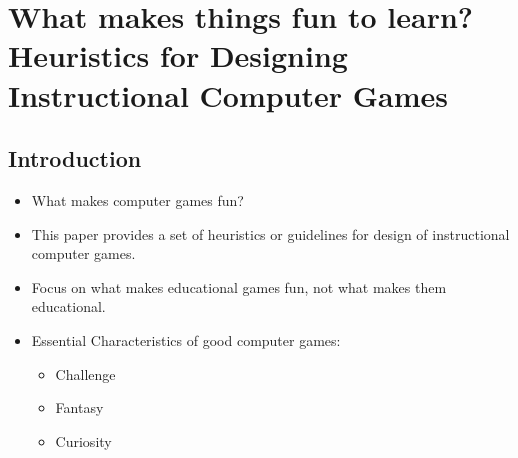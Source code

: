 \chapter*{What makes things fun to learn? Heuristics for Designing Instructional Computer Games}

  \section*{Introduction}
  \begin{itemize}
    \item What makes computer games fun?
    \item This paper provides a set of heuristics or guidelines for design of instructional computer games.
    \item Focus on what makes educational games fun, not what makes them educational.
    \item Essential Characteristics of good computer games:
        \begin{itemize}
            \item Challenge
            \item Fantasy
            \item Curiosity 
        \end{itemize} 
  \end{itemize}

  \clearpage
